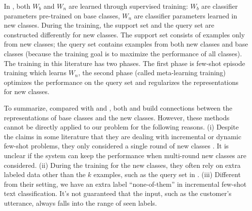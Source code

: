 \documentclass[11pt]{article}
\begin{document}
In \citet{DBLPRenLFZ19}, both $W_b$ and $W_n$ are learned through supervised training:  $W_b$ are classifier parameters pre-trained on base classes, $W_n$ are classifier parameters learned in new classes.
During the training, the support set and the query set are constructed differently for new classes.
The support set consists of examples only from new classes; the query set contains examples from both new classes and base classes (because the training goal is to maximize the performance of all classes). The training in this literature has two phases. The first phase is few-shot episode training which learns $W_n$, the second phase (called meta-learning training) optimizes the performance on the query set and regularizes the representations for new classes.



To summarize, compared with \citet{DBLPSnellSZ17} and \citet{DBLPQiBL18}, both \citet{DBLPGidarisK18} and \citet{DBLPRenLFZ19} build connections between the representations of base classes and the new classes.
However, these methods cannot be directly applied to our problem for the following reasons. (i) Despite the claims in some literature that they are dealing with incremental or dynamic few-shot problems, they only considered a single round of new classes \cite{DBLPQiBL18,DBLPGidarisK18,DBLPRenLFZ19}. It is unclear if the system can keep the performance when multi-round new classes are considered.
(ii) During the training for the new classes, they often rely on extra labeled data other than the $k$ examples, such as the query set in \citet{DBLPRenLFZ19}.
(iii) Different from their setting, we have an extra label ``none-of-them'' in incremental few-shot text classification. It's not guaranteed that the input, such as the customer's utterance, always falls into the range of seen labels.
\end{document}
